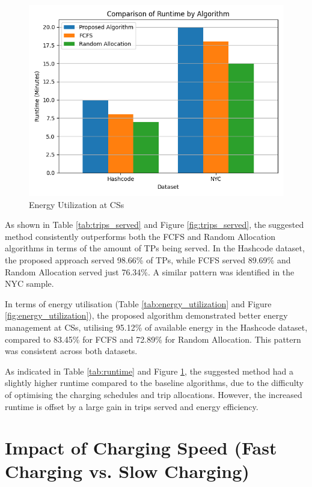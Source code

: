 \begin{figure}[htbp]
\centering
\includegraphics[scale=0.55]{Crest/Images/runtime_comparison.png}
\caption{Energy Utilization at CSs}
\label{fig:run_time}
\end{figure}

As shown in Table \ref{tab:trips_served} and Figure \ref{fig:trips_served}, the suggested method consistently outperforms both the FCFS and Random Allocation algorithms in terms of the amount of TPs being served. In the Hashcode dataset, the proposed approach served 98.66\% of TPs, while FCFS served 89.69\% and Random Allocation served just 76.34\%. A similar pattern was identified in the NYC sample.

In terms of energy utilisation (Table \ref{tab:energy_utilization} and Figure \ref{fig:energy_utilization}), the proposed algorithm demonstrated better energy management at CSs, utilising 95.12\% of available energy in the Hashcode dataset, compared to 83.45\% for FCFS and 72.89\% for Random Allocation. This pattern was consistent across both datasets.

As indicated in Table \ref{tab:runtime} and Figure \ref{fig:run_time}, the suggested method had a slightly higher runtime compared to the baseline algorithms, due to the difficulty of optimising the charging schedules and trip allocations. However, the increased runtime is offset by a large gain in trips served and energy efficiency.

\section{Impact of Charging Speed (Fast Charging vs. Slow Charging)}
\label{sec:charging_speed}

